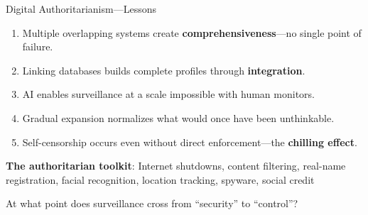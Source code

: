 ﻿\documentclass[aspectratio=169,11pt]{beamer}
\begin{document}
\begin{frame}{Digital Authoritarianism---Lessons}
\begin{conceptbox}
\small
\begin{enumerate}
    \item Multiple overlapping systems create \textbf{comprehensiveness}---no single point of failure.
    \item Linking databases builds complete profiles through \textbf{integration}.
    \item AI enables surveillance at a scale impossible with human monitors.
    \item Gradual expansion normalizes what would once have been unthinkable.
    \item Self-censorship occurs even without direct enforcement---the \textbf{chilling effect}.
\end{enumerate}
\end{conceptbox}

\vspace{0.3em}
\textbf{The authoritarian toolkit}: Internet shutdowns, content filtering, real-name registration, facial recognition, location tracking, spyware, social credit

\begin{discussionbox}[Discussion]
At what point does surveillance cross from ``security'' to ``control''?
\end{discussionbox}
\end{frame}
\end{document}
